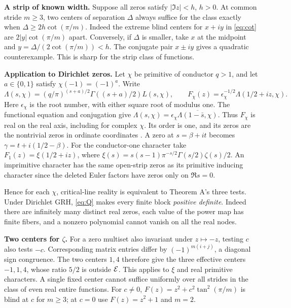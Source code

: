 \documentclass[11pt,letterpaper]{article}
\begin{document}
\textbf{A strip of known width.} Suppose all zeros satisfy \(|\Im z|<h\), \(h>0\). At common stride \(m\ge3\), two centers of separation \(\Delta\) always suffice for the class exactly when \(\Delta\ge 2h\cot(\pi/m)\). Indeed the extreme blind centers for \(x+iy\) in \eqref{eq:cot} are \(2|y|\cot(\pi/m)\) apart. Conversely, if \(\Delta\) is smaller, take \(x\) at the midpoint and \(y=\Delta/(2\cot(\pi/m))<h\). The conjugate pair \(x\pm iy\) gives a quadratic counterexample. This is sharp for the strip class of functions.

\textbf{Application to Dirichlet zeros.} Let \(\chi\) be primitive of conductor \(q>1\), and let \(a\in\{0,1\}\) satisfy \(\chi(-1)=(-1)^a\). Write
\[
 \Lambda(s,\chi)=(q/\pi)^{(s+a)/2}\Gamma((s+a)/2)L(s,\chi),\qquad
 F_\chi(z)=\epsilon_\chi^{-1/2}\Lambda(1/2+iz,\chi).
\]
Here \(\epsilon_\chi\) is the root number, with either square root of modulus one. The functional equation and conjugation give
\(\Lambda(s,\chi)=\epsilon_\chi\overline{\Lambda(1-\bar s,\chi)}\).
Thus \(F_\chi\) is real on the real axis, including for complex \(\chi\). Its order is one, and its zeros are the nontrivial zeros in ordinate coordinates \cite{Lfunctions}. A zero at \(s=\beta+it\) becomes \(\gamma=t+i(1/2-\beta)\). For the conductor-one character take \(F_1(z)=\xi(1/2+iz)\), where \(\xi(s)=s(s-1)\pi^{-s/2}\Gamma(s/2)\zeta(s)/2\). An imprimitive character has the same open-strip zeros as its primitive inducing character since the deleted Euler factors have zeros only on \(\Re s=0\).

Hence for each \(\chi\), critical-line reality is equivalent to Theorem A's three tests. Under Dirichlet GRH, \eqref{eq:Q} makes every finite block \emph{positive definite}. Indeed there are infinitely many distinct real zeros, each value of the power map has finite fibers, and a nonzero polynomial cannot vanish on all the real nodes.

\textbf{Two centers for \(\zeta\).} For a zero multiset also invariant under \(z\mapsto-z\), testing \(c\) also tests \(-c\). Corresponding matrix entries differ by \((-1)^{m(i+j)}\), a diagonal sign congruence. The two centers \(1,4\) therefore give the three effective centers \(-1,1,4\), whose ratio \(5/2\) is outside \(\mathcal E\). This applies to \(\xi\) and real primitive characters. A single fixed center cannot suffice uniformly over all strides in the class of even real entire functions. For \(c\ne0\), \(F(z)=z^2+c^2\tan^2(\pi/m)\) is blind at \(c\) for \(m\ge3\); at \(c=0\) use \(F(z)=z^2+1\) and \(m=2\).
\end{document}
